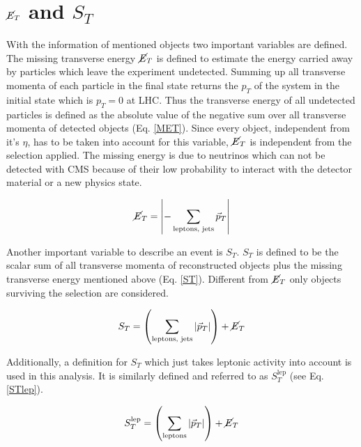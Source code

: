 \section{$\cancel{E}_T$ and $S_T$}
	With the information of mentioned objects two important variables are defined. The missing transverse energy $\cancel{E}_T$ is defined to estimate the energy carried away by particles which leave the experiment undetected. Summing up all transverse momenta of each particle in the final state returns the $p_T$ of the system in the initial state which is $p_T = 0$ at LHC. Thus the transverse energy of all undetected particles is defined as the absolute value of the negative sum over all transverse momenta of detected objects (Eq. \ref{MET}). Since every object, independent from it's $\eta$, has to be taken into account for this variable, $\cancel{E}_T$ is independent from the selection applied. The missing energy is due to neutrinos which can not be detected with CMS because of their low probability to interact with the detector material or a new physics state. 
	
	\begin{equation}
		\cancel{E}_T = \left| - \sum_{\textrm{leptons, jets}}^{} \vec{p}_T \right|
		\label{MET}
	\end{equation}
	
	\noindent Another important variable to describe an event is $S_T$. $S_T$ is defined to be the scalar sum of all transverse momenta of reconstructed objects plus the missing transverse energy mentioned above (Eq. \ref{ST}). Different from $\cancel{E}_T$ only objects surviving the selection are considered.
	
	\begin{equation}
		S_T = \left( \sum_{\textrm{leptons, jets}}^{} \vert \vec{p}_T \vert \right) + \cancel{E}_T
		\label{ST}
	\end{equation}
	
	\noindent Additionally, a definition for $S_T$ which just takes leptonic activity into account is used in this analysis. It is similarly defined and referred to as $S_T^{\text{lep}}$ (see Eq. \ref{STlep}).
	
	\begin{equation}
		S_T^\text{lep} = \left( \sum_{\textrm{leptons}}^{} \vert \vec{p}_T \vert \right) + \cancel{E}_T
		\label{STlep}
	\end{equation}	
